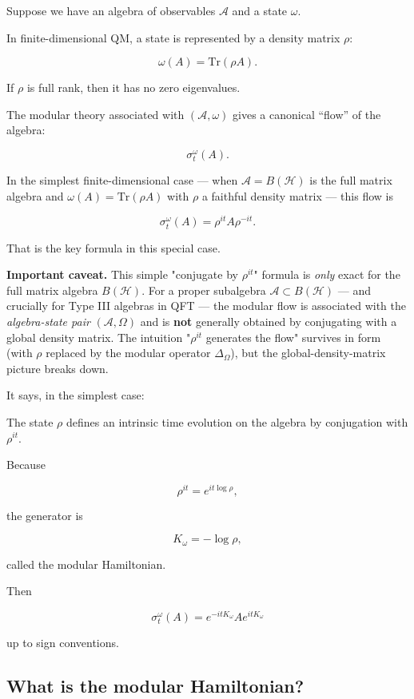 \documentclass[11pt,a4paper]{article}
\newenvironment{qiqtquote}{\begin{mdframed}[style=quotestyle]}{\end{mdframed}}
\begin{document}
Suppose we have an algebra of observables $\mathcal{A}$ and a state $\omega$.

In finite-dimensional QM, a state is represented by a density matrix $\rho$:

\[
\omega(A)=\mathrm{Tr}(\rho A).
\]

If $\rho$ is full rank, then it has no zero eigenvalues.

The modular theory associated with $(\mathcal{A},\omega)$ gives a canonical “flow” of the algebra:

\[
\sigma_t^\omega(A).
\]

In the simplest finite-dimensional case — when $\mathcal{A} = B(\mathcal{H})$ is the full matrix algebra and $\omega(A) = \mathrm{Tr}(\rho A)$ with $\rho$ a faithful density matrix — this flow is

\[
\sigma_t^\omega(A)
=
\rho^{it} A \rho^{-it}.
\]

That is the key formula in this special case.

\textbf{Important caveat.} This simple "conjugate by $\rho^{it}$" formula is \emph{only} exact for the full matrix algebra $B(\mathcal{H})$. For a proper subalgebra $\mathcal{A} \subset B(\mathcal{H})$ — and crucially for Type III algebras in QFT — the modular flow is associated with the \emph{algebra-state pair} $(\mathcal{A}, \Omega)$ and is \textbf{not} generally obtained by conjugating with a global density matrix. The intuition "$\rho^{it}$ generates the flow" survives in form (with $\rho$ replaced by the modular operator $\Delta_\Omega$), but the global-density-matrix picture breaks down.

It says, in the simplest case:

\begin{qiqtquote}
The state $\rho$ defines an intrinsic time evolution on the algebra by conjugation with $\rho^{it}$.
\end{qiqtquote}

Because

\[
\rho^{it}=e^{it\log\rho},
\]

the generator is

\[
K_\omega=-\log\rho,
\]

called the modular Hamiltonian.

Then

\[
\sigma_t^\omega(A)
=
e^{-itK_\omega}A e^{itK_\omega}
\]

up to sign conventions.

\subsection{What is the modular Hamiltonian?}
\end{document}
